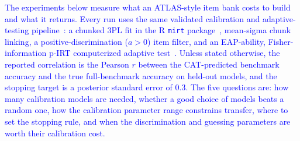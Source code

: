 %
%

\providecommand{\aiadd}[1]{\textcolor{blue}{#1}}
\providecommand{\aibullets}[1]{{\color{blue}#1}}

\aiadd{The experiments below measure what an ATLAS-style item bank costs to
build and what it returns. Every run uses the same validated calibration and
adaptive-testing pipeline~\cite{li2026adaptive}: a chunked 3PL fit in the R
\texttt{mirt} package~\cite{chalmers2012mirt}, mean-sigma chunk linking, a
positive-discrimination ($a>0$) item filter, and an EAP-ability, Fisher-information
p-IRT computerized adaptive test~\cite{lord1980irt,wainer2000cat}. Unless stated
otherwise, the reported correlation is the Pearson $r$ between the CAT-predicted
benchmark accuracy and the true full-benchmark accuracy on held-out models, and
the stopping target is a posterior standard error of $0.3$. The five questions
are: how many calibration models are needed, whether a good choice of models
beats a random one, how the calibration parameter range constrains transfer,
where to set the stopping rule, and when the discrimination and guessing
parameters are worth their calibration cost.}


